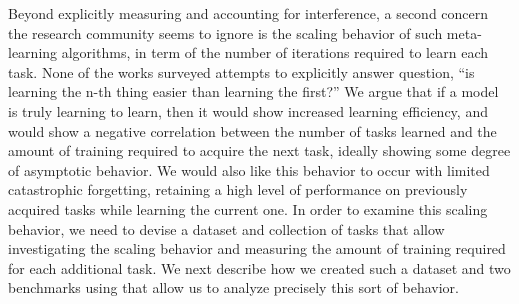 Beyond explicitly measuring and accounting for interference, a second concern the research community seems to ignore is the scaling behavior of such meta-learning algorithms, in term of the number of iterations required to learn each task. None of the works surveyed attempts to explicitly answer  question, ``is learning the n-th thing easier than learning the first?'' We argue that if a model is truly learning to learn, then it would show increased learning efficiency, and would show a negative correlation between the number of tasks learned and the amount of training required to acquire the next task, ideally showing some degree of asymptotic behavior. We would also like this behavior to occur with limited catastrophic forgetting, retaining a high level of performance on previously acquired tasks while learning the current one. In order to examine this scaling behavior, we need to devise a dataset and collection of tasks that allow investigating the scaling behavior and measuring the amount of training required for each additional task. We next describe how we created such a dataset and two benchmarks using that allow us to analyze precisely this sort of behavior.

